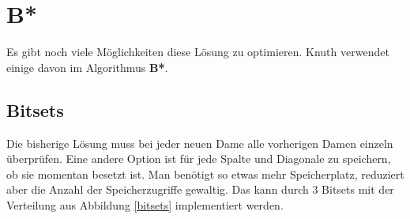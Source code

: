 \section{B*}
Es gibt noch viele Möglichkeiten diese Lösung zu optimieren. Knuth verwendet einige davon im Algorithmus \textbf{B*}\cite[p. 4]{TAOCP}.
\subsection{Bitsets}
Die bisherige Lösung muss bei jeder neuen Dame alle vorherigen Damen einzeln überprüfen. Eine 
andere Option ist für jede Spalte und Diagonale zu speichern, ob sie momentan besetzt ist.
Man benötigt so etwas mehr Speicherplatz, reduziert aber die Anzahl der Speicherzugriffe gewaltig. 
Das kann durch 3 Bitsets mit der Verteilung aus Abbildung \ref{bitsets} implementiert werden.
